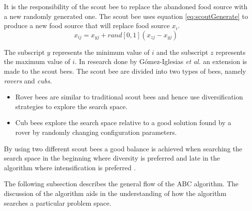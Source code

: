 It is the responsibility of the scout bee to replace the abandoned food source with a new randomly generated one\cite{BeeJobShop,ABCCompareStudy,ABCImageEnhancement}. The scout bee uses equation \ref{eq:scoutGenerate} to produce a new food source that will replace food source $x_i$.
\begin{equation}
\label{eq:scoutGenerate}
x_{ij} = x_{yj} + rand[0,1](x_{zj} - x_{yj})
\end{equation}

The subscript $y$ represents the minimum value of $i$ and the subscript $z$ represents the maximum value of $i$.
In research done by G\'{o}mez-Iglesias \emph{et al.} \cite{ABCFusionGrid} an extension is made to the scout bees. The scout bee are divided into two types of bees, namely \emph{rovers} and \emph{cubs}\cite{ABCFusionGrid}.
\begin{itemize}
\item{Rover bees} are similar to traditional scout bees and hence use diversification strategies to explore the search space. 
\item {Cub bees} explore the search space relative to a good solution found by a rover by randomly changing configuration parameters. 
\end{itemize}
By using two different scout bees a good balance is achieved when searching the search space in the beginning where diversity is preferred and late in the algorithm where intensification is preferred \cite{ABCFusionGrid}.

The following subsection describes the general flow of the \gls{ABC} algorithm. The discussion of the algorithm aids in the understanding of how the algorithm searches a particular problem space. 
